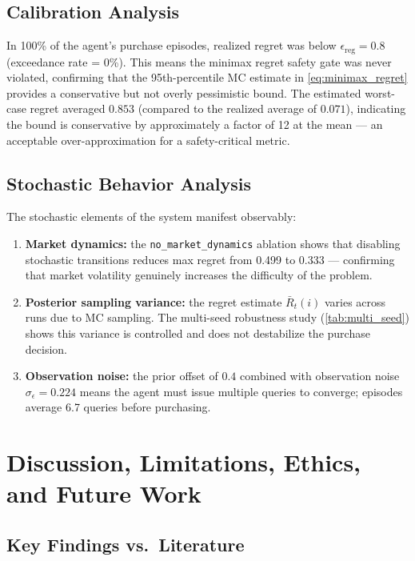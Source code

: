 \documentclass[11pt,letterpaper]{article}
\newcommand{\epsreg}{\epsilon_{\mathrm{reg}}}
\newcommand{\Rbar}{\bar{R}}
\begin{document}
\subsection{Calibration Analysis}

In 100\% of the agent's purchase episodes, realized regret was below $\epsreg = 0.8$ (exceedance rate = 0\%).  This means the minimax regret safety gate was never violated, confirming that the 95th-percentile MC estimate in \cref{eq:minimax_regret} provides a conservative but not overly pessimistic bound.  The estimated worst-case regret averaged $0.853$ (compared to the realized average of $0.071$), indicating the bound is conservative by approximately a factor of 12 at the mean --- an acceptable over-approximation for a safety-critical metric.

\subsection{Stochastic Behavior Analysis}

The stochastic elements of the system manifest observably:
\begin{enumerate}[nosep]
    \item \textbf{Market dynamics:} the \texttt{no\_market\_dynamics} ablation shows that disabling stochastic transitions reduces max regret from 0.499 to 0.333 --- confirming that market volatility genuinely increases the difficulty of the problem.
    \item \textbf{Posterior sampling variance:} the regret estimate $\Rbar_t(i)$ varies across runs due to MC sampling.  The multi-seed robustness study (\cref{tab:multi_seed}) shows this variance is controlled and does not destabilize the purchase decision.
    \item \textbf{Observation noise:} the prior offset of $0.4$ combined with observation noise $\sigma_\epsilon = 0.224$ means the agent must issue multiple queries to converge; episodes average 6.7 queries before purchasing.
\end{enumerate}

\section{Discussion, Limitations, Ethics, and Future Work}
\label{sec:discussion}

\subsection{Key Findings vs.\ Literature}
\end{document}
